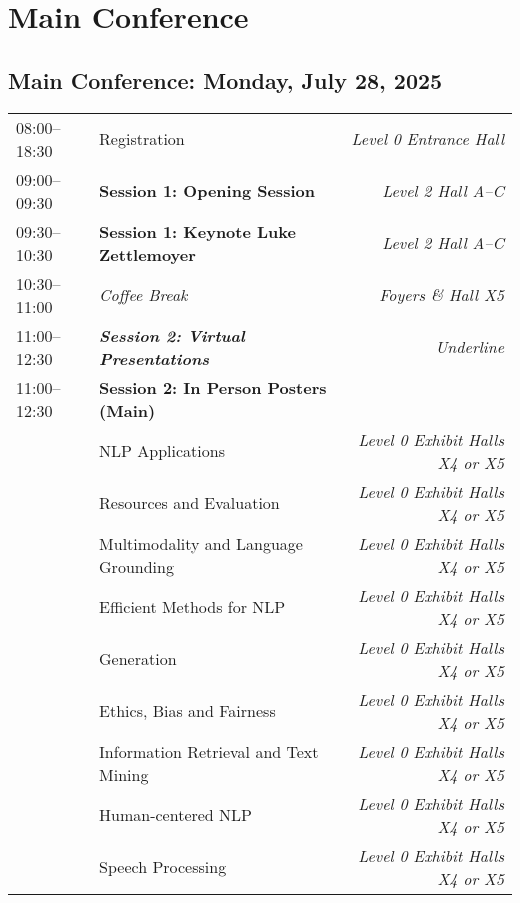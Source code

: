 \chapter{Main Conference}

\begingroup

\renewcommand{\arraystretch}{1.8}

\section{Main Conference: Monday, July 28, 2025}

\begin{xltabular}{\linewidth}{l X r}
    08:00--18:30    &   Registration    &   \textit{Level 0 Entrance Hall} \\
    
    09:00--09:30    &   \textbf{Session 1: Opening Session}  &   \textit{Level 2 Hall A--C} \\
    09:30--10:30    &   \textbf{Session 1: Keynote Luke Zettlemoyer}    &   \textit{Level 2 Hall A--C} \\
    
    10:30--11:00    &   \textit{Coffee Break}    & \textit{Foyers \& Hall X5}  \\
    
    11:00--12:30    &   \textit{\textbf{Session 2: Virtual Presentations}}    & \textit{Underline}  \\
    11:00--12:30    &   \textbf{Session 2: In Person Posters (Main)} & \\
    &   NLP Applications  & \textit{Level 0 Exhibit Halls X4 or X5} \\
    &   Resources and Evaluation  & \textit{Level 0 Exhibit Halls X4 or X5} \\
    &   Multimodality and Language Grounding  & \textit{Level 0 Exhibit Halls X4 or X5} \\
    &   Efficient Methods for NLP  & \textit{Level 0 Exhibit Halls X4 or X5} \\
    &   Generation  & \textit{Level 0 Exhibit Halls X4 or X5} \\
    &   Ethics, Bias and Fairness  & \textit{Level 0 Exhibit Halls X4 or X5} \\
    &   Information Retrieval and Text Mining  & \textit{Level 0 Exhibit Halls X4 or X5} \\
    &   Human-centered NLP  & \textit{Level 0 Exhibit Halls X4 or X5} \\
    &   Speech Processing  & \textit{Level 0 Exhibit Halls X4 or X5} \\


\end{xltabular}

